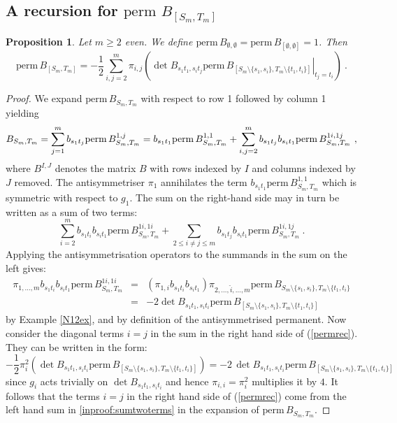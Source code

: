 \documentclass[10pt]{amsart}
\newcommand{\perm}{\mathrm{perm}\,}
\theoremstyle{plain}
\newtheorem{prop}[thm]{Proposition}
\newcommand{\0}{\color{blue}{\mathsf{0}}}
\begin{document}
\subsection{A recursion for \texorpdfstring{$\perm\, B_{[S_m,T_m]}$}{the permanent}}
\begin{prop}\label{recprop1}
Let $m\geq2$ even. We define $\perm B_{\emptyset,\emptyset}=\perm B_{[\emptyset,\emptyset]}=1$. Then
\begin{equation}\label{permrec}
\perm B_{[S_m,T_m]} =-\frac12\sum_{i,j=2}^{m}\pi_{i,j} \left(\det B_{s_1t_1,s_it_j}
\left.\perm B_{[S_{m}\setminus  \{s_1,s_i\},T_{m}\setminus \{t_1,t_i\}]}\right|_{t_j=t_i}\right)  \ . 
\end{equation}
\end{prop}
\begin{proof}
We expand $\perm B_{S_m,T_m}$ with respect to row 1 followed by  column 1  yielding
$$
B_{S_m,T_m}=\sum_{j=1}^mb_{s_1t_j}\perm B_{S_m,T_m}^{1,j}\\
=b_{s_1t_1}\perm B_{S_m,T_m}^{1,1}+
\sum_{i,j=2}^mb_{s_1t_j}b_{s_it_1}\perm B_{S_m,T_m}^{1i,1j}\ ,
$$
where  $B^{I,J}$ denotes the matrix $B$ with rows indexed by $I$ and columns indexed by $J$ removed.
The antisymmetriser $\pi_1$ annihilates the  term $b_{s_1t_1}\perm B_{S_m,T_m}^{1,1}$ which is symmetric with respect to $g_1$. 
The sum on the right-hand side may in turn  be written as a sum of two terms:
\begin{equation} \label{inproof:sumtwoterms} \sum_{i=2}^m  b_{s_1t_i}b_{s_it_1}\perm B_{S_m,T_m}^{1i,1i}  + \sum_{2 \leq i\neq j \leq m }b_{s_1t_j}b_{s_it_1}\perm B_{S_m,T_m}^{1i,1j}  \ .      \end{equation}
Applying the antisymmetrisation operators to the summands in the sum on the left gives:
\begin{eqnarray}\pi_{1,\ldots,m}b_{s_1t_i}b_{s_it_1}\perm B_{S_m,T_m}^{1i,1i} & = &
\left(\pi_{1,i}b_{s_1t_i}b_{s_it_1} \right) \pi_{2,\ldots,\hat{i},\ldots,m}\perm B_{S_m\setminus \{s_1,s_i\},T_m\setminus \{t_1,t_i\}}   \nonumber \\
& = & -2 \det B_{s_1t_1,s_it_i}   \perm B_{[S_m\setminus \{s_1,s_i\},T_m\setminus \{t_1,t_i\}]}  \nonumber  \end{eqnarray}
by Example \ref{N12ex}, and 
by definition of the antisymmetrised permanent.  Now consider the diagonal terms $i=j$ in the sum in the right hand side of  (\ref{permrec}). They can be written in the form: 
\[   -\frac{1}{2} \pi^2_{i} \left(\det B_{s_1t_1,s_it_i} \perm B_{[S_{m}\setminus  \{s_1,s_i\},T_{m}\setminus \{t_1,t_i\}]}\right)  =   -2  \, \det B_{s_1t_1,s_it_i}   \perm B_{[S_{m}\setminus  \{s_1,s_i\},T_{m}\setminus \{t_1,t_i\}]}   \]
since $g_i$ acts trivially on $\det B_{s_1t_1,s_it_i}$ and hence 
$\pi_{i,i}=\pi_i^2$ multiplies it  by $4$. 
It follows that  the terms $i=j$ in the right hand side of  (\ref{permrec}) come from the left hand sum in \eqref{inproof:sumtwoterms} in the
expansion of $\perm B_{S_m,T_m}$.


\end{proof}
\end{document}
